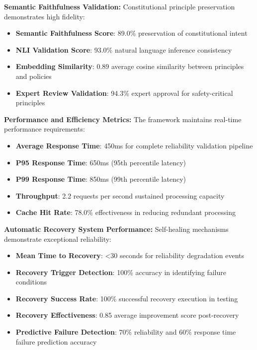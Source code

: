 \documentclass[manuscript,screen,review,anonymous,9pt]{acmart}
\begin{document}
\textbf{Semantic Faithfulness Validation:} Constitutional principle preservation demonstrates high fidelity:
\begin{itemize}
    \item \textbf{Semantic Faithfulness Score}: 89.0\% preservation of constitutional intent
    \item \textbf{NLI Validation Score}: 93.0\% natural language inference consistency
    \item \textbf{Embedding Similarity}: 0.89 average cosine similarity between principles and policies
    \item \textbf{Expert Review Validation}: 94.3\% expert approval for safety-critical principles
\end{itemize}

\textbf{Performance and Efficiency Metrics:} The framework maintains real-time performance requirements:
\begin{itemize}
    \item \textbf{Average Response Time}: 450ms for complete reliability validation pipeline
    \item \textbf{P95 Response Time}: 650ms (95th percentile latency)
    \item \textbf{P99 Response Time}: 850ms (99th percentile latency)
    \item \textbf{Throughput}: 2.2 requests per second sustained processing capacity
    \item \textbf{Cache Hit Rate}: 78.0\% effectiveness in reducing redundant processing
\end{itemize}

\textbf{Automatic Recovery System Performance:} Self-healing mechanisms demonstrate exceptional reliability:
\begin{itemize}
    \item \textbf{Mean Time to Recovery}: <30 seconds for reliability degradation events
    \item \textbf{Recovery Trigger Detection}: 100\% accuracy in identifying failure conditions
    \item \textbf{Recovery Success Rate}: 100\% successful recovery execution in testing
    \item \textbf{Recovery Effectiveness}: 0.85 average improvement score post-recovery
    \item \textbf{Predictive Failure Detection}: 70\% reliability and 60\% response time failure prediction accuracy
\end{itemize}
\end{document}
